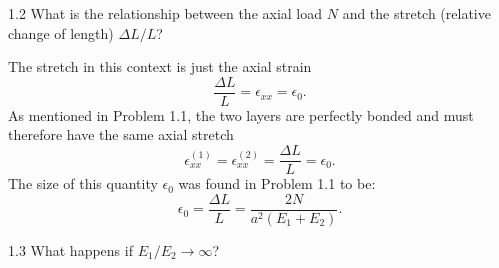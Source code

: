   \begin{problem}{1.2}
    What is the relationship between the axial load $N$ and the stretch (relative change of length) $\Delta L / L$?
  \end{problem}

  \begin{derivation}
    The stretch in this context is just the axial strain
    \begin{equation*}
      \frac{\Delta L}{L} = \epsilon_{x x} = \epsilon_0
    .\end{equation*}
    As mentioned in Problem 1.1, the two layers are perfectly bonded and must therefore have the same axial stretch
    \begin{equation*}
      \epsilon_{x x}^{(1)} = \epsilon_{x x}^{(2)} = \frac{\Delta L}{L} = \epsilon_0
    .\end{equation*}
    The size of this quantity $\epsilon_0$ was found in Problem 1.1 to be:
    \begin{equation*}
      \epsilon_0 = \frac{\Delta L}{L} = \frac{2N}{a^2 \left( E_1 + E_2 \right)}
    .\end{equation*}
  \end{derivation}


  \begin{problem}{1.3}
    What happens if $E_1 / E_2 \to \infty$?
  \end{problem}

